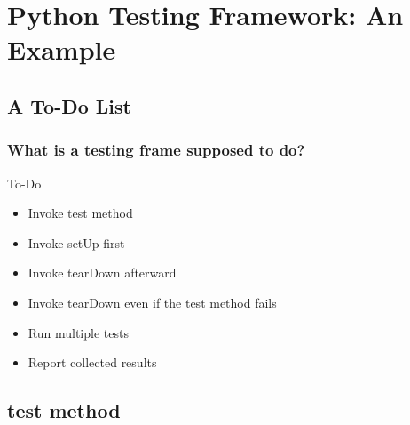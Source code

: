 \documentclass[lualatex]{beamer}
\begin{document}
\section[Testing Framework]{Python Testing Framework: An Example}

\subsection{A To-Do List}

\begin{frame}
    \frametitle{What is a testing frame supposed to do?}

    \begin{block}{To-Do}
        \begin{itemize}
            \item Invoke test method
            \item Invoke setUp first 
            \item Invoke tearDown afterward 
            \item Invoke tearDown even if the test method fails 
            \item Run multiple tests 
            \item Report collected results 
        \end{itemize}
    \end{block}
\end{frame}

\subsection{test method}
\end{document}
